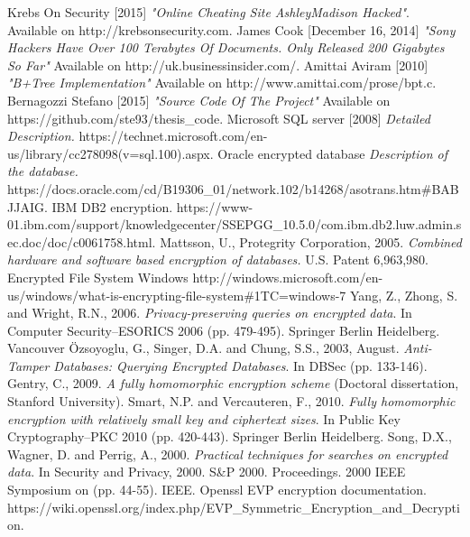 \begin{thebibliography}{5} 
Krebs On Security [2015] \emph{"Online Cheating Site AshleyMadison Hacked"}. Available on http://krebsonsecurity.com.
James Cook [December 16, 2014] \emph{"Sony Hackers Have Over 100 Terabytes Of Documents. Only Released 200 Gigabytes So Far"} Available on http://uk.businessinsider.com/.
Amittai Aviram [2010] \emph{"B+Tree Implementation"} Available on http://www.amittai.com/prose/bpt.c.
Bernagozzi Stefano [2015] \emph{"Source Code Of The Project"} Available on https://github.com/ste93/thesis\_code.
Microsoft SQL server [2008] \emph{Detailed Description.}
https://technet.microsoft.com/en-us/library/cc278098(v=sql.100).aspx.
Oracle encrypted database \emph{Description of the database.}
https://docs.oracle.com/cd\allowbreak{}/B19306\_01/network.102/b14268/asotrans.htm\#BABJJAIG.
IBM DB2 encryption. https://www-01.ibm.com/support/knowledgecenter/SSEPGG\allowbreak{}\_10.5.0/com.ibm.db2.luw.admin.sec.doc/doc/c0061758.html.
Mattsson, U., Protegrity Corporation, 2005. \emph{Combined hardware and software based encryption of databases.} U.S. Patent 6,963,980.
Encrypted File System Windows http://windows.microsoft.com/en-us/windows/what-is-encrypting-file-system\#1TC=windows-7
Yang, Z., Zhong, S. and Wright, R.N., 2006. \emph{Privacy-preserving queries on encrypted data}. In Computer Security–ESORICS 2006 (pp. 479-495). Springer Berlin Heidelberg.
Vancouver	
Özsoyoglu, G., Singer, D.A. and Chung, S.S., 2003, August. \emph{Anti-Tamper Databases: Querying Encrypted Databases}. In DBSec (pp. 133-146).
Gentry, C., 2009. \emph{A fully homomorphic encryption scheme} (Doctoral dissertation, Stanford University).
Smart, N.P. and Vercauteren, F., 2010. \emph{Fully homomorphic encryption with relatively small key and ciphertext sizes}. In Public Key Cryptography–PKC 2010 (pp. 420-443). Springer Berlin Heidelberg.
Song, D.X., Wagner, D. and Perrig, A., 2000. \emph{Practical techniques for searches on encrypted data}. In Security and Privacy, 2000. S\&P 2000. Proceedings. 2000 IEEE Symposium on (pp. 44-55). IEEE.
Openssl EVP encryption documentation.  https://wiki.openssl.org/index.php/EVP\allowbreak{}\_Symmetric\_Encryption\_and\_Decryption.
\end{thebibliography} 

